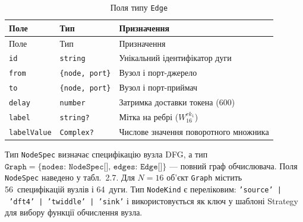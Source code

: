 \begin{longtable}[]{@{}
  >{\raggedright\arraybackslash}p{}
  >{\raggedright\arraybackslash}p{}
  >{\raggedright\arraybackslash}p{}@{}}
\caption[Поля типу Edge]{Поля типу \texttt{Edge}}\tabularnewline
\toprule\noalign{}
\begin{minipage}[b]{\linewidth}\raggedright
Поле
\end{minipage} & \begin{minipage}[b]{\linewidth}\raggedright
Тип
\end{minipage} & \begin{minipage}[b]{\linewidth}\raggedright
Призначення
\end{minipage} \\
\midrule\noalign{}
\endfirsthead
\toprule\noalign{}
\begin{minipage}[b]{\linewidth}\raggedright
Поле
\end{minipage} & \begin{minipage}[b]{\linewidth}\raggedright
Тип
\end{minipage} & \begin{minipage}[b]{\linewidth}\raggedright
Призначення
\end{minipage} \\
\midrule\noalign{}
\endhead
\bottomrule\noalign{}
\endlastfoot
\texttt{id} & \texttt{string} & Унікальний ідентифікатор дуги \\
\texttt{from} & \texttt{\{node, port\}} & Вузол і порт-джерело \\
\texttt{to} & \texttt{\{node, port\}} & Вузол і порт-приймач \\
\texttt{delay} & \texttt{number} & Затримка доставки токена (600) \\
\texttt{label} & \texttt{string?} & Мітка на ребрі (\(W_{16}^{rk_{1}}\)) \\
\texttt{labelValue} & \texttt{Complex?} & Числове значення поворотного
множника \\
\end{longtable}

Тип \texttt{NodeSpec} визначає специфікацію вузла DFG, а тип
\(\texttt{Graph}=\{\texttt{nodes: NodeSpec[]},\,\texttt{edges: Edge[]}\}\)
--- повний граф обчислювача. Поля \texttt{NodeSpec} наведено у
табл.~2.7. Для \(N=16\) об'єкт \texttt{Graph} містить 56~специфікацій
вузлів і 64~дуги. Тип \texttt{NodeKind} є переліковим:
\texttt{'source'~|~'dft4'~|~'twiddle'~|~'sink'} і використовується як
ключ у шаблоні Strategy для вибору функції обчислення вузла.

